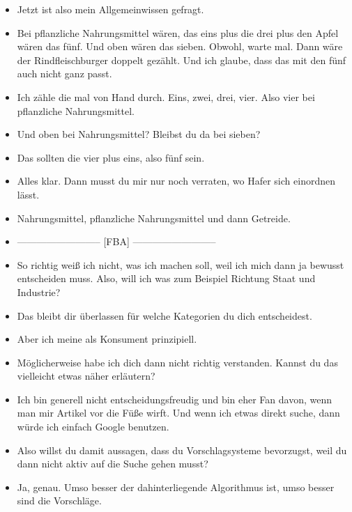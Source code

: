 {\begin{itemize}[]
            \item {} Jetzt ist also mein Allgemeinwissen gefragt.
            \item {} Bei pflanzliche Nahrungsmittel wären, das eins plus die drei plus den Apfel wären das fünf.
                  Und oben wären das sieben.
                  Obwohl, warte mal.
                  Dann wäre der Rindfleischburger doppelt gezählt.
                  Und ich glaube, dass das mit den fünf auch nicht ganz passt.
            \item {} Ich zähle die mal von Hand durch. Eins, zwei, drei, vier. Also vier bei pflanzliche Nahrungsmittel.
            \item {} Und oben bei Nahrungsmittel? Bleibst du da bei sieben?
            \item {} Das sollten die vier plus eins, also fünf sein.
            \item {} Alles klar. Dann musst du mir nur noch verraten, wo Hafer sich einordnen lässt.
            \item {} Nahrungsmittel, pflanzliche Nahrungsmittel und dann Getreide.
            \item {--------------------------} [FBA] {--------------------------}
            \item {} So richtig weiß ich nicht, was ich machen soll, weil ich mich dann ja bewusst entscheiden muss.
                  Also, will ich was zum Beispiel Richtung Staat und Industrie?
            \item {} Das bleibt dir überlassen für welche Kategorien du dich entscheidest.
            \item {} Aber ich meine als Konsument prinzipiell.
            \item {} Möglicherweise habe ich dich dann nicht richtig verstanden. Kannst du das vielleicht etwas näher erläutern?
            \item {} Ich bin generell nicht entscheidungsfreudig und bin eher Fan davon, wenn man mir Artikel vor die Füße wirft.
                  Und wenn ich etwas direkt suche, dann würde ich einfach Google benutzen.
            \item {} Also willst du damit aussagen, dass du Vorschlagsysteme bevorzugst, weil du dann nicht aktiv auf die Suche gehen musst?
            \item {} Ja, genau.
                  Umso besser der dahinterliegende Algorithmus ist, umso besser sind die Vorschläge.

\end{itemize}}
